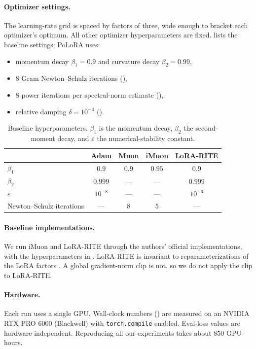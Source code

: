 \documentclass[11pt]{article}
\newcommand{\methodname}{PoLoRA\xspace}
\theoremstyle{plain}
\theoremstyle{definition}
\theoremstyle{remark}
\theoremstyle{definition}
\begin{document}
\paragraph{Optimizer settings.} The learning-rate grid is spaced by factors of three, wide enough to bracket each optimizer's optimum. All other optimizer hyperparameters are fixed.  lists the baseline settings; \methodname{} uses:
\begin{itemize}[leftmargin=1.5em,itemsep=1pt,topsep=2pt]
  \item momentum decay $\beta_1=0.9$ and curvature decay $\beta_2=0.99$,
  \item $8$ Gram Newton--Schulz iterations (),
  \item $8$ power iterations per spectral-norm estimate (),
  \item relative damping $\delta=10^{-4}$ ().
\end{itemize}
\begin{table}[ht]
\centering\small
\begin{tabular}{@{}lcccc@{}}
\toprule
 & Adam & Muon & iMuon & LoRA-RITE \\
\midrule
$\beta_1$                 & $0.9$     & $0.9$ & $0.95$ & $0.9$     \\
$\beta_2$                 & $0.999$   & ---   & ---    & $0.999$   \\
$\varepsilon$             & $10^{-8}$ & ---   & ---    & $10^{-6}$ \\
Newton--Schulz iterations & ---       & $8$   & $5$    & ---       \\
\bottomrule
\end{tabular}
\caption{Baseline hyperparameters. $\beta_1$ is the momentum decay, $\beta_2$ the second-moment decay, and $\varepsilon$ the numerical-stability constant.}
\label{tab:optim-config}
\end{table}

\paragraph{Baseline implementations.} We run iMuon and LoRA-RITE through the authors' official implementations, with the hyperparameters in . LoRA-RITE is invariant to reparameterizations of the LoRA factors \cite[Def.~1]{lorarite}. A global gradient-norm clip is not, so we do not apply the  clip to LoRA-RITE.

\paragraph{Hardware.} Each run uses a single GPU. Wall-clock numbers () are measured on an NVIDIA RTX PRO 6000 (Blackwell) with \texttt{torch.compile} enabled. Eval-loss values are hardware-independent. Reproducing all our experiments takes about $850$ GPU-hours.
\end{document}
